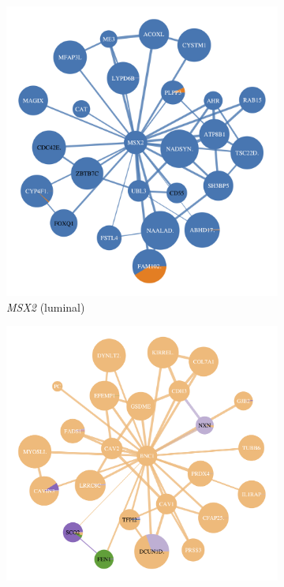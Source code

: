 \begin{figure}[!b]
    \centering
    \begin{subfigure}[!t]{0.49\textwidth}
        \includegraphics[width=1.0\textwidth,height=1.0\textheight,keepaspectratio]{Sections/Network_I/Resources/selective_pruning/net/net_MSX2.png}
        \caption{\textit{MSX2} (luminal)}
        \label{fig:N_I:net_MSX2}
    \end{subfigure}
    \centering
    \begin{subfigure}[!t]{0.49\textwidth}
        \includegraphics[width=1.0\textwidth,height=1.0\textheight,keepaspectratio]{Sections/Network_I/Resources/selective_pruning/net/net_BNC1.png}

\end{subfigure}
\end{figure}
